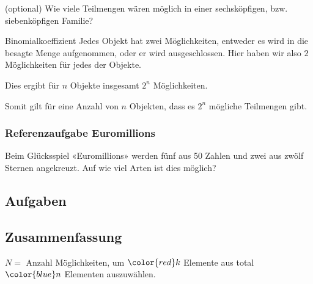   
(optional) Wie viele Teilmengen wären möglich in einer sechsköpfigen,
  bzw. siebenköpfigen Familie?



\begin{bemerkung}{Binomialkoeffizient}{}
  Jedes Objekt hat zwei Möglichkeiten, entweder es wird in die besagte
  Menge aufgenommen, oder er wird ausgeschlossen. Hier haben wir also
  $2$ Möglichkeiten für jedes der Objekte.
  
  Dies ergibt für $n$ Objekte insgesamt $2^n$ Möglichkeiten.

  Somit gilt für eine Anzahl von $n$ Objekten, dass es $2^n$ mögliche
  Teilmengen gibt.
\end{bemerkung}

\newpage

\subsubsection{Referenzaufgabe Euromillions}
Beim Glücksspiel «Euromillions» werden fünf aus 50 Zahlen und zwei aus zwölf Sternen angekreuzt. Auf wie viel Arten ist dies möglich?

\newpage


\subsection*{Aufgaben}





\newpage

\subsection{Zusammenfassung}
$N = $
Anzahl Möglichkeiten, um $\color{red}k$ Elemente aus total $\color{blue}n$ Elementen auszuwählen.

